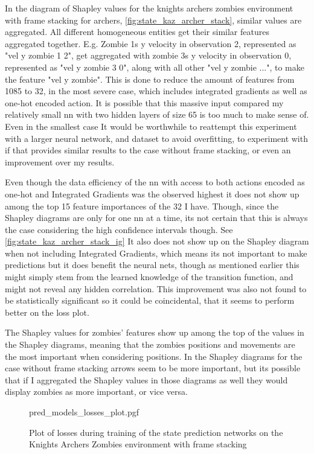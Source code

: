 \documentclass[UKenglish]{uiomasterthesis}
\begin{document}
In the diagram of Shapley values for the knights archers zombies environment with frame stacking for archers, \cref{fig:state_kaz_archer_stack}, similar values are aggregated. All different homogeneous entities get their similar features aggregated together. E.g. Zombie 1s y velocity in observation 2, represented as "vel y zombie 1 2", get aggregated with zombie 3s y velocity in observation 0, represented as "vel y zombie 3 0", along with all other "vel y zombie ...", to make the feature "vel y zombie". This is done to reduce the amount of features from 1085 to 32, in the most severe case, which includes integrated gradients as well as one-hot encoded action. 
It is possible that this massive input compared my relatively small \ac{nn} with two hidden layers of size 65 is too much to make sense of. Even in the smallest case  It would be worthwhile to reattempt this experiment with a larger neural network, and dataset to avoid overfitting, to experiment with if that provides similar results to the case without frame stacking, or even an improvement over my results.

Even though the data efficiency of the \ac{nn} with access to both actions encoded as one-hot and Integrated Gradients was the observed highest it does not show up among the top 15 feature importances of the 32 I have. Though, since the Shapley diagrams are only for one \ac{nn} at a time, its not certain that this is always the case considering the high confidence intervals though. See \cref{fig:state_kaz_archer_stack_ig} It also does not show up on the Shapley diagram when not including Integrated Gradients, which means its not important to make predictions but it does benefit the neural nets, though as mentioned earlier this might simply stem from the learned knowledge of the transition function, and might not reveal any hidden correlation. This improvement was also not found to be statistically significant so it could be coincidental, that it seems to perform better on the loss plot.

The Shapley values for zombies' features show up among the top of the values in the Shapley diagrams, meaning that the zombies positions and movements are the most important when considering positions. In the Shapley diagrams for the case without frame stacking arrows seem to be more important, but its possible that if I aggregated the Shapley values in those diagrams as well they would display zombies as more important, or vice versa.

\begin{figure}[hbtp]
    \centering
    {pred_models_losses_plot.pgf}
    \caption{Plot of losses during training of the state prediction networks on the Knights Archers Zombies environment with frame stacking}
	\label{fig:pred_losses_kaz_archer_stack}
\end{figure}
\end{document}
